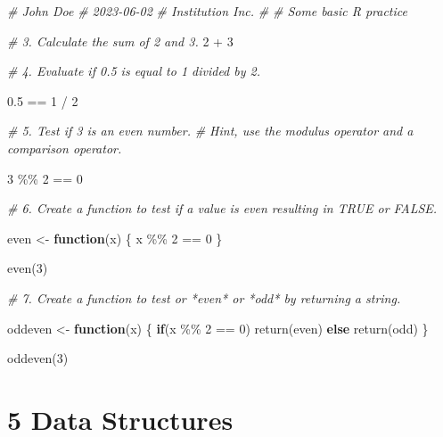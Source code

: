 \documentclass[
]{book}
\newenvironment{Shaded}{\begin{snugshade}}{\end{snugshade}}
\newcommand{\CommentTok}[1]{\textcolor[rgb]{0.56,0.35,0.01}{\textit{#1}}}
\newcommand{\ControlFlowTok}[1]{\textcolor[rgb]{0.13,0.29,0.53}{\textbf{#1}}}
\newcommand{\DecValTok}[1]{\textcolor[rgb]{0.00,0.00,0.81}{#1}}
\newcommand{\FloatTok}[1]{\textcolor[rgb]{0.00,0.00,0.81}{#1}}
\newcommand{\FunctionTok}[1]{\textcolor[rgb]{0.00,0.00,0.00}{#1}}
\newcommand{\NormalTok}[1]{#1}
\newcommand{\OtherTok}[1]{\textcolor[rgb]{0.56,0.35,0.01}{#1}}
\newcommand{\SpecialCharTok}[1]{\textcolor[rgb]{0.00,0.00,0.00}{#1}}
\newcommand{\StringTok}[1]{\textcolor[rgb]{0.31,0.60,0.02}{#1}}
\begin{document}
\begin{Shaded}
\begin{Highlighting}[]
\CommentTok{\# John Doe}
\CommentTok{\# 2023{-}06{-}02}
\CommentTok{\# Institution Inc.}
\CommentTok{\#}
\CommentTok{\# Some basic R practice}

\CommentTok{\# 3.  Calculate the sum of 2 and 3.}
\DecValTok{2} \SpecialCharTok{+} \DecValTok{3}

\CommentTok{\# 4.  Evaluate if 0.5 is equal to 1 divided by 2.}

\FloatTok{0.5} \SpecialCharTok{==} \DecValTok{1} \SpecialCharTok{/} \DecValTok{2}

\CommentTok{\# 5.  Test if 3 is an even number. }
\CommentTok{\#     Hint, use the modulus operator and a comparison operator.}

\DecValTok{3} \SpecialCharTok{\%\%} \DecValTok{2} \SpecialCharTok{==} \DecValTok{0}

\CommentTok{\# 6.  Create a function to test if a value is even resulting in \textasciigrave{}TRUE\textasciigrave{} or \textasciigrave{}FALSE\textasciigrave{}.}

\NormalTok{even }\OtherTok{\textless{}{-}} \ControlFlowTok{function}\NormalTok{(x) \{ x }\SpecialCharTok{\%\%} \DecValTok{2} \SpecialCharTok{==} \DecValTok{0}\NormalTok{ \}}

\FunctionTok{even}\NormalTok{(}\DecValTok{3}\NormalTok{)}

\CommentTok{\# 7.  Create a function to test or *even* or *odd* by returning a string.}

\NormalTok{oddeven }\OtherTok{\textless{}{-}} \ControlFlowTok{function}\NormalTok{(x) \{ }
  \ControlFlowTok{if}\NormalTok{(x }\SpecialCharTok{\%\%} \DecValTok{2} \SpecialCharTok{==} \DecValTok{0}\NormalTok{) }\FunctionTok{return}\NormalTok{(}\StringTok{\textquotesingle{}even\textquotesingle{}}\NormalTok{)}
  \ControlFlowTok{else} \FunctionTok{return}\NormalTok{(}\StringTok{\textquotesingle{}odd\textquotesingle{}}\NormalTok{)}
\NormalTok{\}}

\FunctionTok{oddeven}\NormalTok{(}\DecValTok{3}\NormalTok{)}
\end{Highlighting}
\end{Shaded}

\hypertarget{data-structures-1}{%
\section*{\texorpdfstring{\textbf{5} Data Structures}{5 Data Structures}}\label{data-structures-1}}
\end{document}
